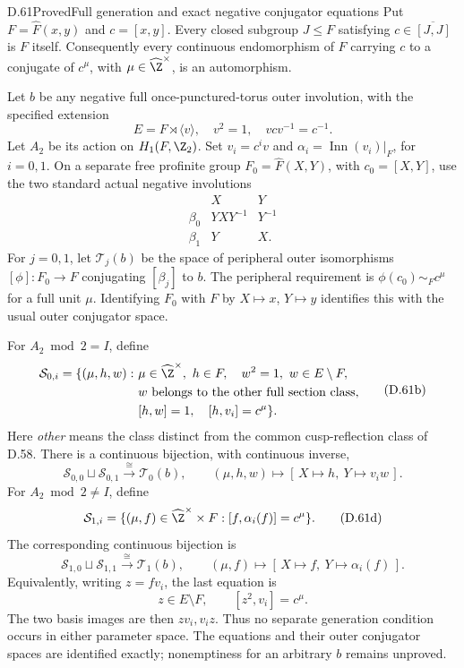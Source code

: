 \begin{claim}{D.61}{Proved}{Full generation and exact negative conjugator equations}
Put $F=\widehat F(x,y)$ and $c=[x,y]$.
Every closed subgroup $J\leq F$ satisfying
$c\in\overline{[J,J]}$ is $F$ itself.
Consequently every continuous endomorphism of $F$
carrying $c$ to a conjugate of $c^\mu$, with
$\mu\in\widehat\Z^\times$, is an automorphism.

Let $b$ be any negative full once-punctured-torus
outer involution, with the specified extension
\[
 E=F\rtimes\langle v\rangle,\quad
 v^2=1,\quad vcv^{-1}=c^{-1}.
\]
Let $A_2$ be its action on $H_1(F,\Z_2)$.
Set $v_i=c^iv$ and
$\alpha_i=\operatorname{Inn}(v_i)|_F$, for $i=0,1$.
On a separate free profinite group
$F_0=\widehat F(X,Y)$, with $c_0=[X,Y]$, use the
two standard actual negative involutions
\[
 \begin{array}{c|cc}
      &X&Y\\ \hline
 \beta_0&YXY^{-1}&Y^{-1}\\
 \beta_1&Y&X .
 \end{array}                                             \tag{D.61a}
\]
For $j=0,1$, let $\mathcal T_j(b)$ be the space
of peripheral outer isomorphisms $[\phi]:F_0\to F$
conjugating $[\beta_j]$ to $b$.
The peripheral requirement is
$\phi(c_0)\sim_F c^\mu$ for a full unit $\mu$.
Identifying $F_0$ with $F$ by $X\mapsto x$,
$Y\mapsto y$ identifies this with the usual
outer conjugator space.

For $A_2\bmod2=I$, define
\[
 \begin{split}
 \mathcal S_{0,i}=\{(\mu,h,w):\
 &\mu\in\widehat\Z^\times,\ h\in F,\quad
 w^2=1,\ w\in E\setminus F,\\
 &w\text{ belongs to the other full section class},\\
 &[h,w]=1,\quad [h,v_i]=c^\mu\}.
 \end{split}                                             \tag{D.61b}
\]
Here \emph{other} means the class distinct from the
common cusp-reflection class of D.58.
There is a continuous bijection, with continuous
inverse,
\[
 \mathcal S_{0,0}\sqcup\mathcal S_{0,1}
       \xrightarrow{\ \cong\ }\mathcal T_0(b),\qquad
 (\mu,h,w)\longmapsto
             [\,X\mapsto h,\ Y\mapsto v_iw\,].            \tag{D.61c}
\]
For $A_2\bmod2\ne I$, define
\[
 \mathcal S_{1,i}
   =\{(\mu,f)\in\widehat\Z^\times\times F:
                         [f,\alpha_i(f)]=c^\mu\}.
                                                               \tag{D.61d}
\]
The corresponding continuous bijection is
\[
 \mathcal S_{1,0}\sqcup\mathcal S_{1,1}
       \xrightarrow{\ \cong\ }\mathcal T_1(b),\qquad
 (\mu,f)\longmapsto
             [\,X\mapsto f,\ Y\mapsto\alpha_i(f)\,].
                                                               \tag{D.61e}
\]
Equivalently, writing $z=fv_i$, the last equation
is
\[
                z\in E\setminus F,\qquad
                         [z^2,v_i]=c^\mu.               \tag{D.61f}
\]
The two basis images are then $zv_i,v_iz$.
Thus no separate generation condition occurs in
either parameter space. The equations and their
outer conjugator spaces are identified exactly;
nonemptiness for an arbitrary $b$ remains unproved.
\end{claim}

